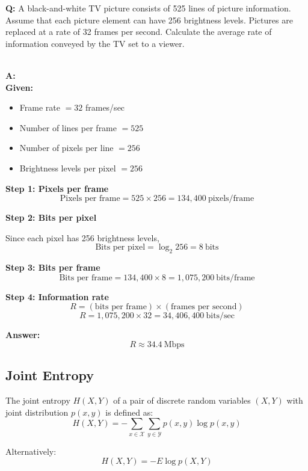 \documentclass[11pt,a4paper]{book}
\newenvironment{definitionbox}[1][Definition]{
    \begin{tcolorbox}[
        enhanced,
        breakable,
        colback=primaryblue!10,
        colframe=primaryblue!150,
        title=#1,
        fonttitle=\bfseries,
        sharp corners,
        boxrule=0.8pt,
        left=8pt,
        right=8pt,
        top=6pt,
        bottom=6pt
    ]
}{
    \end{tcolorbox}
}
\newcounter{qna}[chapter]
\renewcommand{\theqna}{\thechapter.\arabic{qna}}
\newenvironment{questionanswerbox}{
    \refstepcounter{qna}%
    \begin{tcolorbox}[
        enhanced,
        breakable,
        colback=softlavender!10,
        colframe=softlavender!200,
        title={Example~\theqna}, %
        fonttitle=\bfseries,
        coltitle=white,
        colbacktitle=softlavender!200,
        sharp corners,
        boxrule=1pt,
        left=8pt,
        right=8pt,
        top=6pt,
        bottom=6pt
    ]
}{
    \end{tcolorbox}
}
\begin{document}
\begin{questionanswerbox}
\textbf{Q:} A black-and-white TV picture consists of 525 lines of picture information.
Assume that each picture element can have 256 brightness levels.
Pictures are replaced at a rate of 32 frames per second.
Calculate the average rate of information conveyed by the TV set to a viewer.

\medskip\\
\textbf{A:}
\medskip\\
\textbf{Given:}
\begin{itemize}
    \item Frame rate \(= 32\) frames/sec
    \item Number of lines per frame \(= 525\)
    \item Number of pixels per line \(= 256\)
    \item Brightness levels per pixel \(= 256\)
    
\end{itemize}

\medskip

\textbf{Step 1: Pixels per frame}
\[
\text{Pixels per frame}
= 525 \times 256
= 134{,}400 \ \text{pixels/frame}
\]

\medskip

\textbf{Step 2: Bits per pixel}

Since each pixel has 256 brightness levels,
\[
\text{Bits per pixel} = \log_2 256 = 8 \ \text{bits}
\]

\medskip

\textbf{Step 3: Bits per frame}
\[
\text{Bits per frame}
= 134{,}400 \times 8
= 1{,}075{,}200 \ \text{bits/frame}
\]

\medskip

\textbf{Step 4: Information rate}
\[
R = (\text{bits per frame}) \times (\text{frames per second})
\]
\[
R = 1{,}075{,}200 \times 32
= 34{,}406{,}400 \ \text{bits/sec}
\]

\medskip

\textbf{Answer:}
\[
\boxed{R \approx 34.4 \ \text{Mbps}}
\]
\end{questionanswerbox}

\subsection{Joint Entropy}

\begin{definitionbox}[Joint Entropy]
    The joint entropy \(H(X,Y)\) of a pair of discrete random variables \((X,Y)\) with joint distribution \(p(x,y)\) is defined as:
    \[
        H(X,Y) = -\sum_{x \in \mathcal{X}} \sum_{y \in \mathcal{Y}} p(x,y) \log p(x,y)
    \]

    Alternatively:
    \[
        H(X,Y) = -E \log p(X,Y)
    \]
\end{definitionbox}
\end{document}
